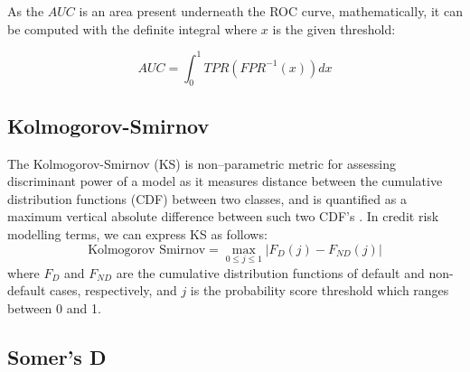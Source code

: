 As the $AUC$ is an area present underneath the ROC curve, mathematically, it can be computed with the definite integral where $x$ is the given threshold:

\begin{equation}\label{eq}
    AUC = \int_{0}^{1} TPR \left(FPR^{-1}\left(x \right)\right) dx
\end{equation}

\subsection{Kolmogorov-Smirnov}

The Kolmogorov-Smirnov (KS) is non--parametric metric for assessing discriminant power of a model as it measures distance between the cumulative distribution functions (CDF) between two classes, and is quantified as a maximum vertical absolute difference between such two CDF's \citep{adeodato2016equivalence}.
In credit risk modelling terms, we can express KS as follows:
\begin{equation}\label{eq}
    \text{Kolmogorov Smirnov} = \max_{0 \le j \le 1} \left| F_D \left(j \right) - F_{ND} \left(j \right) \right|
\end{equation}
where $F_D$ and $F_{ND}$ are the cumulative distribution functions of default and non-default cases, respectively, and $j$ is the probability score threshold which ranges between 0 and 1.
\subsection{Somer's D}


